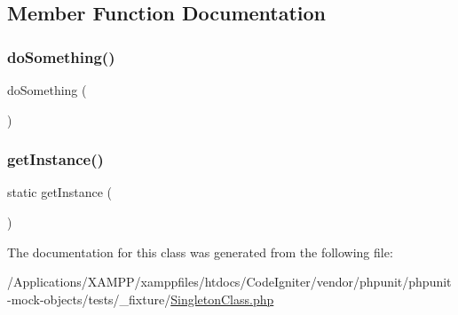 \subsection{Member Function Documentation}
\mbox{\label{class_singleton_class_abe91a8abe16159c0096d570ee6ccc985}} 
\subsubsection{\texorpdfstring{do\+Something()}{doSomething()}}
{\footnotesize\ttfamily do\+Something (\begin{DoxyParamCaption}{ }\end{DoxyParamCaption})}

\mbox{\label{class_singleton_class_ac93fbec81f07e5d15f80db907e63dc10}} 
\subsubsection{\texorpdfstring{get\+Instance()}{getInstance()}}
{\footnotesize\ttfamily static get\+Instance (\begin{DoxyParamCaption}{ }\end{DoxyParamCaption})\hspace{0.3cm}{\ttfamily [static]}}



The documentation for this class was generated from the following file\+:\begin{DoxyCompactItemize}
\item 
/\+Applications/\+X\+A\+M\+P\+P/xamppfiles/htdocs/\+Code\+Igniter/vendor/phpunit/phpunit-\/mock-\/objects/tests/\+\_\+fixture/\mbox{\hyperlink{_singleton_class_8php}{Singleton\+Class.\+php}}\end{DoxyCompactItemize}
